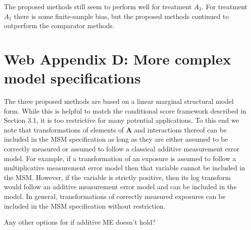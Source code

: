 \documentclass[12pt]{article}
\begin{document}
The proposed methods still seem to perform well for treatment $A_{3}$. For treatment $A_{1}$ there is some finite-sample bias, but the proposed methods continued to outperform the comparator methods.

\section{Web Appendix D: More complex model specifications}

The three proposed methods are based on a linear marginal structural model form. While this is helpful to match the conditional score framework described in Section 3.1, it is too restrictive for many potential applications. To this end we note that transformations of elements of $\bm{A}$ and interactions thereof can be included in the MSM specification as long as they are either assumed to be correctly measured or assumed to follow a classical additive measurement error model. For example, if a transformation of an exposure is assumed to follow a multiplicative measurement error model then that variable cannot be included in the MSM. However, if the variable is strictly positive, then its log transform would follow an additive measurement error model and can be included in the model. In general, transformations of correctly measured exposures can be included in the MSM specification without restriction.

Any other options for if additive ME doesn't hold?



\end{document}

